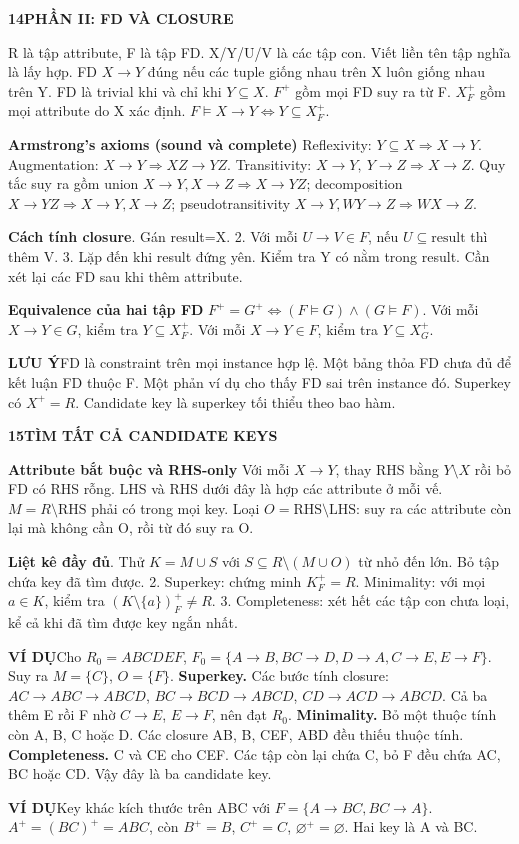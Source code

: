 \documentclass[a4paper]{article}
\newcommand{\bodyfontsize}{5.55}
\newcommand{\bodyleading}{5.2}
\newcommand{\codefontsize}{5.05}
\newcommand{\codeleading}{5.0}
\newcommand{\bodylineskiplimit}{-2pt}
\newcommand{\bodystyle}{%
  \fontsize{\bodyfontsize}{\bodyleading}\selectfont\setlength{\lineskiplimit}{\bodylineskiplimit}\RaggedRight
  \setlength{\abovedisplayskip}{.5pt}\setlength{\belowdisplayskip}{.5pt}%
  \setlength{\abovedisplayshortskip}{.3pt}\setlength{\belowdisplayshortskip}{.3pt}}
\newcommand{\topic}[2]{\par\addvspace{.45pt}\nointerlineskip%
  \begingroup\setlength{\fboxsep}{0.35pt}%
  \noindent\colorbox{structure}{\parbox{\dimexpr\linewidth-2\fboxsep\relax}{%
    \color{white}\fontsize{6.45}{6.8}\selectfont\bfseries #1\enspace #2}}%
  \endgroup\par\nobreak\vspace{.55pt}\nointerlineskip\nobreak}
\newenvironment{topicblock}
  {\par\bodystyle}
  {\par}
\newcommand{\key}[1]{\par\textcolor{structure}{\textbf{#1}}\enspace}
\newcommand{\note}[4]{\par\nointerlineskip\vspace{.25pt}\begingroup\setlength{\fboxsep}{0.1pt}%
  \noindent\colorbox{#1}{\parbox{\dimexpr\linewidth-2\fboxsep\relax}{%
    \RaggedRight\textcolor{#2}{\textbf{#3}}\enspace #4}}%
  \endgroup\par\nointerlineskip\vspace{.25pt}}
\newcommand{\trap}[1]{\note{warningbg}{warning}{LƯU Ý}{#1}}
\newcommand{\ex}[1]{\note{examplebg}{example}{VÍ DỤ}{#1}}
\newlength{\sheetwidth}
\newenvironment{sheetcolumns}[1]
  {\noindent\begin{minipage}[t]{#1\sheetwidth}\vspace{0pt}\bodystyle\ignorespaces}
  {\end{minipage}\par}
\begin{document}
\newpage
\renewcommand{\bodyfontsize}{5.80}
\renewcommand{\bodyleading}{5.3}
\renewcommand{\codefontsize}{5.15}
\renewcommand{\codeleading}{5.0}
\renewcommand{\bodylineskiplimit}{-1.5pt}
\begin{sheetcolumns}{.272}
\begin{topicblock}
\topic{14}{PHẦN II: FD VÀ CLOSURE}
R là tập attribute, F là tập FD. X/Y/U/V là các tập con. Viết liền tên tập nghĩa là lấy hợp.
FD $X\to Y$ đúng nếu các tuple giống nhau trên X luôn giống nhau trên Y. FD là trivial khi và chỉ khi $Y\subseteq X$. $F^+$ gồm mọi FD suy ra từ F. $X_F^+$ gồm mọi attribute do X xác định. $F\models X\to Y\iff Y\subseteq X_F^+$.
\key{Armstrong's axioms (sound và complete)}
Reflexivity: $Y\subseteq X\Rightarrow X\to Y$.
Augmentation: $X\to Y\Rightarrow XZ\to YZ$.
Transitivity: $X\to Y,\ Y\to Z\Rightarrow X\to Z$.
Quy tắc suy ra gồm union $X\to Y, X\to Z\Rightarrow X\to YZ$;
decomposition $X\to YZ\Rightarrow X\to Y,X\to Z$;
pseudotransitivity $X\to Y,WY\to Z\Rightarrow WX\to Z$.
\key{Cách tính closure}
1. Gán result=X. 2. Với mỗi $U\to V\in F$, nếu $U\subseteq\mathrm{result}$ thì thêm V. 3. Lặp đến khi result đứng yên. Kiểm tra Y có nằm trong result. Cần xét lại các FD sau khi thêm attribute.
\key{Equivalence của hai tập FD}
\mbox{$F^+=G^+\iff (F\models G)\land(G\models F)$.}
Với mỗi $X\to Y\in G$, kiểm tra $Y\subseteq X_F^+$. Với mỗi $X\to Y\in F$, kiểm tra $Y\subseteq X_G^+$.
\trap{FD là constraint trên mọi instance hợp lệ. Một bảng thỏa FD chưa đủ để kết luận FD thuộc F. Một phản ví dụ cho thấy FD sai trên instance đó. Superkey có $X^+=R$. Candidate key là superkey tối thiểu theo bao hàm.}
\end{topicblock}

\begin{topicblock}
\topic{15}{TÌM TẤT CẢ CANDIDATE KEYS}
\key{Attribute bắt buộc và RHS-only}
Với mỗi $X\to Y$, thay RHS bằng $Y\setminus X$ rồi bỏ FD có RHS rỗng. LHS và RHS dưới đây là hợp các attribute ở mỗi vế.
$M=R\setminus\mathrm{RHS}$ phải có trong mọi key. Loại $O=\mathrm{RHS}\setminus\mathrm{LHS}$: suy ra các attribute còn lại mà không cần O, rồi từ đó suy ra O.
\key{Liệt kê đầy đủ}
1. Thử $K=M\cup S$ với $S\subseteq R\setminus(M\cup O)$ từ nhỏ đến lớn. Bỏ tập chứa key đã tìm được.
2. Superkey: chứng minh $K_F^+=R$. Minimality: với mọi $a\in K$, kiểm tra $(K\setminus\{a\})_F^+\ne R$.
3. Completeness: xét hết các tập con chưa loại, kể cả khi đã tìm được key ngắn nhất.
\ex{Cho $R_0=ABCDEF$, $F_0=\{A\to B,BC\to D,D\to A,C\to E,E\to F\}$. Suy ra $M=\{C\}$, $O=\{F\}$.
\textbf{Superkey.} Các bước tính closure:
$AC\to ABC\to ABCD$,
$BC\to BCD\to ABCD$,
$CD\to ACD\to ABCD$. Cả ba thêm E rồi F nhờ $C\to E$, $E\to F$, nên đạt $R_0$.
\textbf{Minimality.} Bỏ một thuộc tính còn A, B, C hoặc D. Các closure AB, B, CEF, ABD đều thiếu thuộc tính.
\textbf{Completeness.} C và CE cho CEF. Các tập còn lại chứa C, bỏ F đều chứa AC, BC hoặc CD. Vậy đây là ba candidate key.}
\ex{Key khác kích thước trên ABC với $F=\{A\to BC,BC\to A\}$. $A^+=(BC)^+=ABC$, còn $B^+=B$, $C^+=C$, $\varnothing^+=\varnothing$. Hai key là A và BC.}
\end{topicblock}


\end{sheetcolumns}
\end{document}
